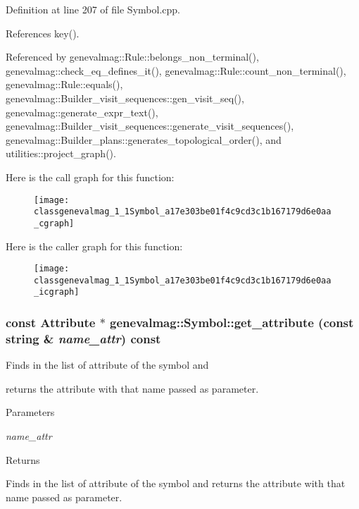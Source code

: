 Definition at line 207 of file Symbol.cpp.



References key().



Referenced by genevalmag::Rule::belongs\_\-non\_\-terminal(), genevalmag::check\_\-eq\_\-defines\_\-it(), genevalmag::Rule::count\_\-non\_\-terminal(), genevalmag::Rule::equals(), genevalmag::Builder\_\-visit\_\-sequences::gen\_\-visit\_\-seq(), genevalmag::generate\_\-expr\_\-text(), genevalmag::Builder\_\-visit\_\-sequences::generate\_\-visit\_\-sequences(), genevalmag::Builder\_\-plans::generates\_\-topological\_\-order(), and utilities::project\_\-graph().



Here is the call graph for this function:\nopagebreak
\begin{figure}[H]
\begin{center}
\leavevmode
\texttt{[image: classgenevalmag\_1\_1Symbol\_a17e303be01f4c9cd3c1b167179d6e0aa\_cgraph]}
\end{center}
\end{figure}




Here is the caller graph for this function:\nopagebreak
\begin{figure}[H]
\begin{center}
\leavevmode
\texttt{[image: classgenevalmag\_1\_1Symbol\_a17e303be01f4c9cd3c1b167179d6e0aa\_icgraph]}
\end{center}
\end{figure}


\hypertarget{classgenevalmag_1_1Symbol_a58f45135b17a802eb9e124d91875204b}{
\subsubsection[{get\_\-attribute}]{\setlength{\rightskip}{0pt plus 5cm}const {\bf Attribute} $\ast$ genevalmag::Symbol::get\_\-attribute (const string \& {\em name\_\-attr}) const}}
\label{classgenevalmag_1_1Symbol_a58f45135b17a802eb9e124d91875204b}
Finds in the list of attribute of the symbol and\par
 returns the attribute with that name passed as parameter. 
\begin{DoxyParams}{Parameters}
\item[{\em name\_\-attr}]\end{DoxyParams}
\begin{DoxyReturn}{Returns}

\end{DoxyReturn}
Finds in the list of attribute of the symbol and returns the attribute with that name passed as parameter. 

